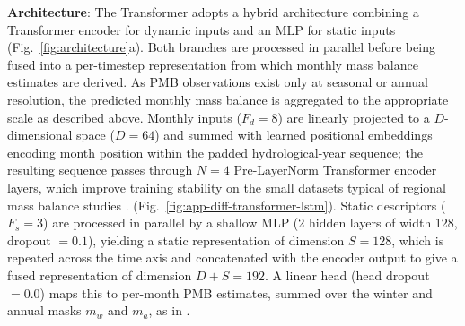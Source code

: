 \documentclass[draft]{agujournal2019}
\begin{document}
\textbf{Architecture}: The Transformer adopts a hybrid architecture combining a Transformer encoder for dynamic inputs and an MLP for static inputs (Fig.~\ref{fig:architecture}a). Both branches are processed in parallel before being fused into a per-timestep representation from which monthly mass balance estimates are derived. As PMB observations exist only at seasonal or annual resolution, the predicted monthly mass balance is aggregated to the appropriate scale as described above. Monthly inputs ($F_d = 8$) are linearly projected to a $D$-dimensional space ($D = 64$) and summed with learned positional embeddings encoding month position within the padded hydrological-year sequence; the resulting sequence passes through $N = 4$ Pre-LayerNorm Transformer encoder layers, which improve training stability on the small datasets typical of regional mass balance studies \citep[e.g.,][]{Xiong_2020}.   (Fig.~\ref{fig:app-diff-transformer-lstm}). Static descriptors ($F_s = 3$) are processed in parallel by a shallow MLP (2 hidden layers of width 128, dropout $= 0.1$), yielding a static representation of dimension $S = 128$, which is repeated across the time axis and concatenated with the encoder output to give a fused representation of dimension $D + S = 192$. A linear head (head dropout $= 0.0$) maps this to per-month PMB estimates, summed over the winter and annual masks $m_w$ and $m_a$, as in \citet{vanderMeer_2026}. \citep{vanderMeer_2026}
\end{document}
